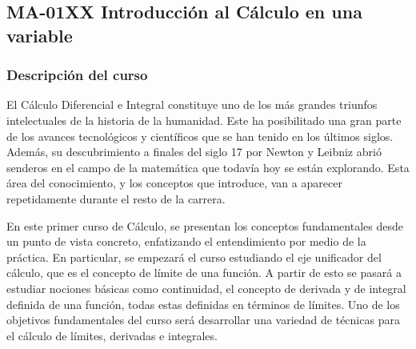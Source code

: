 




\newpage
\subsection*{MA-01XX Introducción al Cálculo en una variable}

\begin{refsection}
\begin{table}[H]
\end{table}



\subsubsection*{Descripción del curso}

El Cálculo Diferencial e Integral constituye uno de los más grandes triunfos intelectuales de la historia de la humanidad. Este ha posibilitado una gran parte de los avances tecnológicos y científicos que se han tenido en los últimos siglos. Además, su descubrimiento a finales del siglo 17 por Newton y Leibniz  abrió senderos en el campo de la matemática que todavía hoy se están explorando.
Esta área del conocimiento, y los conceptos que introduce, van a aparecer repetidamente durante el resto de la carrera.

En este primer curso de Cálculo, se presentan los conceptos fundamentales desde un punto de vista concreto, enfatizando el entendimiento por medio de la práctica. En particular, se empezará el curso estudiando el eje unificador del cálculo, que es el concepto de límite de una función. A partir de esto se pasará a estudiar nociones básicas como continuidad, el concepto de derivada y de integral definida de una función, todas estas definidas en términos de límites. Uno de los objetivos fundamentales del curso será desarrollar una variedad de técnicas para el cálculo de límites, derivadas e integrales.


\end{refsection}
